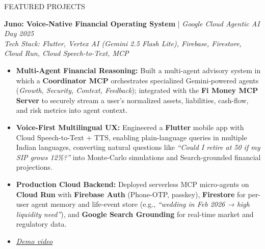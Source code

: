 \documentclass{resume} %
\begin{document}
\begin{rSection}{FEATURED PROJECTS}
\vspace{-1.25em}

\item \textbf{Juno: Voice-Native Financial Operating System} | \textit{Google Cloud Agentic AI Day 2025} \\
\textit{Tech Stack: Flutter, Vertex AI (Gemini 2.5 Flash Lite), Firebase, Firestore, Cloud Run, Cloud Speech-to-Text, MCP}
\begin{itemize}
    \item \textbf{Multi-Agent Financial Reasoning:} Built a multi-agent advisory system in which a \textbf{Coordinator MCP} orchestrates specialized Gemini-powered agents (\textit{Growth, Security, Context, Feedback}); integrated with the \textbf{Fi Money MCP Server} to securely stream a user's normalized assets, liabilities, cash-flow, and risk metrics into agent context.
    \item \textbf{Voice-First Multilingual UX:} Engineered a \textbf{Flutter} mobile app with Cloud Speech-to-Text + TTS, enabling plain-language queries in multiple Indian languages, converting natural questions like \textit{``Could I retire at 50 if my SIP grows 12\%?''} into Monte-Carlo simulations and Search-grounded financial projections.
    \item \textbf{Production Cloud Backend:} Deployed serverless MCP micro-agents on \textbf{Cloud Run} with \textbf{Firebase Auth} (Phone-OTP, passkey), \textbf{Firestore} for per-user agent memory and life-event store (e.g., \textit{``wedding in Feb 2026 → high liquidity need''}), and \textbf{Google Search Grounding} for real-time market and regulatory data.
    \item \href{https://drive.google.com/file/d/12SFmxkaDG8kcLFpLTg6fAuKgeOlFq4Y8/view?usp=sharing}{\textit{Demo video}}
\end{itemize}

\vspace{0.5em}


\end{rSection}
\end{document}

